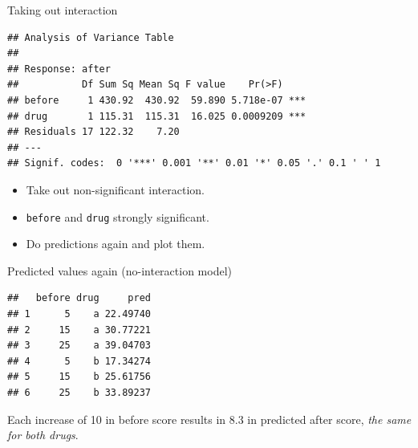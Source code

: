 \begin{frame}[fragile]{Taking out interaction}


{\small
  
 
\begin{knitrout}
\color{fgcolor}\begin{kframe}
\begin{alltt}
\hlkwb{=}\hlopt{~}\hlopt{+}
\end{alltt}
\begin{verbatim}
## Analysis of Variance Table
## 
## Response: after
##           Df Sum Sq Mean Sq F value    Pr(>F)    
## before     1 430.92  430.92  59.890 5.718e-07 ***
## drug       1 115.31  115.31  16.025 0.0009209 ***
## Residuals 17 122.32    7.20                      
## ---
## Signif. codes:  0 '***' 0.001 '**' 0.01 '*' 0.05 '.' 0.1 ' ' 1
\end{verbatim}
\end{kframe}
\end{knitrout}
}
  
  \begin{itemize}
  \item Take out non-significant interaction.
  \item \texttt{before} and \texttt{drug} strongly significant.
  \item Do predictions again and plot them.
  \end{itemize}
  
\end{frame}

\begin{frame}[fragile]{Predicted values again (no-interaction model)}

   
\begin{knitrout}
\color{fgcolor}\begin{kframe}
\begin{alltt}
\hlkwb{=}
\hlkwb{=}
\end{alltt}
\begin{verbatim}
##   before drug     pred
## 1      5    a 22.49740
## 2     15    a 30.77221
## 3     25    a 39.04703
## 4      5    b 17.34274
## 5     15    b 25.61756
## 6     25    b 33.89237
\end{verbatim}
\end{kframe}
\end{knitrout}
 

Each increase of 10 in before score results in 8.3 in predicted after
score, \emph{the same for both drugs}.
  
\end{frame}

